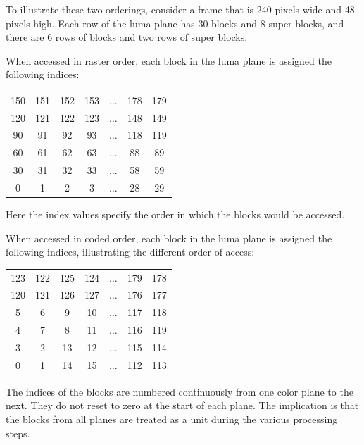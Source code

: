 \documentclass[11pt,letterpaper]{book}
\numberwithin{equation}{chapter}
\numberwithin{figure}{chapter}
\numberwithin{table}{chapter}
\begin{document}
To illustrate these two orderings, consider a frame that is 240 pixels wide and
 48 pixels high.
Each row of the luma plane has 30 blocks and 8 super blocks, and there are 6
 rows of blocks and two rows of super blocks.

When accessed in raster order, each block in the luma plane is assigned the
 following indices:

\vspace{\baselineskip}
\begin{center}
\begin{tabular}{|ccccccc|}\hline
150 & 151 & 152 & 153 & $\ldots$ & 178 & 179 \\
120 & 121 & 122 & 123 & $\ldots$ & 148 & 149 \\\hline
 90 &  91 &  92 &  93 & $\ldots$ & 118 & 119 \\
 60 &  61 &  62 &  63 & $\ldots$ &  88 &  89 \\
 30 &  31 &  32 &  33 & $\ldots$ &  58 &  59 \\
  0 &   1 &   2 &   3 & $\ldots$ &  28 &  29 \\\hline
\end{tabular}
\end{center}
\vspace{\baselineskip}

Here the index values specify the order in which the blocks would be accessed.

When accessed in coded order, each block in the luma plane is assigned the
 following indices, illustrating the different order of access:

\vspace{\baselineskip}
\begin{center}
\begin{tabular}{|cccc|c|cc|}\hline
123 & 122 & 125 & 124 & $\ldots$ & 179 & 178 \\
120 & 121 & 126 & 127 & $\ldots$ & 176 & 177 \\\hline
  5 &   6 &   9 &  10 & $\ldots$ & 117 & 118 \\
  4 &   7 &   8 &  11 & $\ldots$ & 116 & 119 \\
  3 &   2 &  13 &  12 & $\ldots$ & 115 & 114 \\
  0 &   1 &  14 &  15 & $\ldots$ & 112 & 113 \\\hline
\end{tabular}
\end{center}
\vspace{\baselineskip}

The indices of the blocks are numbered continuously from one color plane to the
 next.
They do not reset to zero at the start of each plane.
The implication is that the blocks from all planes are treated as a unit during
 the various processing steps.
\end{document}
